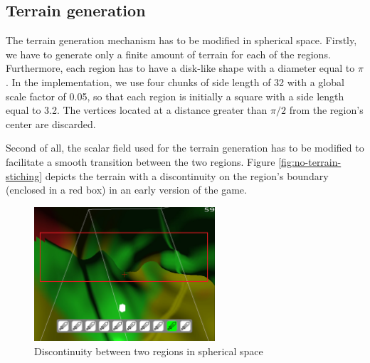 \subsection{Terrain generation}
The terrain generation mechanism has to be modified in spherical space.
Firstly, we have to generate only a finite amount of terrain for each of the regions.
Furthermore, each region has to have a disk-like shape with a diameter equal to $\pi$.
In the implementation, we use four chunks of side length of 32 with a global scale factor of 0.05, so that each region is initially a square with a side length equal to 3.2.
The vertices located at a distance greater than $\pi/2$ from the region's center are discarded.

Second of all, the scalar field used for the terrain generation has to be modified to facilitate a smooth transition between the two regions.
Figure \autoref{fig:no-terrain-stiching} depicts the terrain with a discontinuity on the region's boundary (enclosed in a red box) in an early version of the game.
\begin{figure}[h]
    \centering
    \includegraphics[width=0.6\textwidth]{chapters/problems/resources/no-terrain-stiching.png}
    \caption{Discontinuity between two regions in spherical space}
    \label{fig:no-terrain-stiching}
\end{figure}


